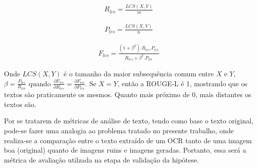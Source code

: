 \begin{gather}
  R_{lcs} = \frac{LCS(X, Y)}{m}
\end{gather}

\begin{gather}
  P_{lcs} = \frac{LCS(X, Y)}{n}
\end{gather}

\begin{gather}
  F_{lcs} = \frac{(1 + \beta^2).R_{lcs} . P_{lcs}}{R_{lcs} + \beta^2.P_{lcs} }
\end{gather}

Onde \(LCS(X, Y)\) é o tamanho da maior subsequência comum entre $X$ e $Y$, \(\beta = \frac{P_{lcs}}{R_{lcs}}\) quando \(\frac{\partial F_{lcs}}{\partial R_{lcs}} = \frac{\partial F_{lcs}}{\partial P_{lcs}}\). Se \(X = Y\), então a ROUGE-L é 1, mostrando que os textos são praticamente os mesmos. Quanto mais próximo de 0, mais distantes os textos são.

\ornament

Por se tratarem de métricas de análise de texto, tendo como base o texto original, pode-se fazer uma analogia ao problema tratado no presente trabalho, onde realiza-se a comparação entre o texto extraído de um OCR tanto de uma imagem boa (original) quanto de imagens ruins e imagens geradas. Portanto, essa será a métrica de avaliação utilzada na etapa de validação da hipótese.



